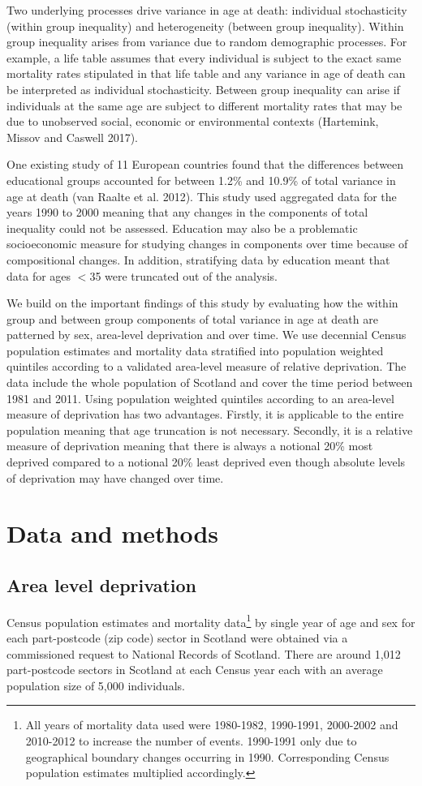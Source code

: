\documentclass[12pt,oneside,a4paper]{article} %
\theoremstyle{definition}
\begin{document}
Two underlying processes drive variance in age at death: individual stochasticity (within group inequality) and heterogeneity (between group inequality). Within group inequality arises from variance due to random demographic processes. For example, a life table assumes that every individual is subject to the exact same mortality rates stipulated in that life table and any variance in age of death can be interpreted as individual stochasticity. Between group inequality can arise if individuals at the same age are subject to different mortality rates that may be due to unobserved social, economic or environmental contexts (Hartemink, Missov and Caswell 2017). 

One existing study of 11 European countries found that the differences between educational groups accounted for between 1.2\% and 10.9\% of total variance in age at death (van Raalte et al. 2012). This study used aggregated data for the years  1990 to 2000 meaning that any changes in the components of total inequality could not be assessed. Education may also be a problematic socioeconomic measure for studying changes in components over time because of compositional changes.  In addition, stratifying data by education meant that data for ages $<$35 were truncated out of the analysis. 
 
We build on the important findings of this study by evaluating how the within group and between group components of total variance in age at death are patterned by sex, area-level deprivation and over time. We use decennial Census population estimates and mortality data stratified into population weighted quintiles according to a validated area-level measure of relative deprivation. The data  include the whole population of Scotland and cover the time period between 1981 and 2011. Using population weighted quintiles according to an area-level measure of deprivation has two advantages. Firstly, it is applicable to the entire population meaning that age truncation is not necessary. Secondly, it is a relative measure of deprivation meaning that there is always a notional 20\% most deprived compared to a notional 20\% least deprived even though absolute levels of deprivation may have changed over time. 


\section{Data and methods}

\subsection{Area level deprivation}
Census population estimates and mortality  data\footnote{All years of mortality data used were 1980-1982, 1990-1991, 2000-2002 and 2010-2012 to increase the number of events. 1990-1991 only due to geographical boundary changes occurring in 1990. Corresponding Census population estimates multiplied accordingly.} by single year of age and sex for each part-postcode (zip code) sector in Scotland  were obtained via a commissioned request to National Records of Scotland. There are around 1,012 part-postcode sectors in Scotland at each Census year each with an average population size of 5,000 individuals.
 
\end{document}
